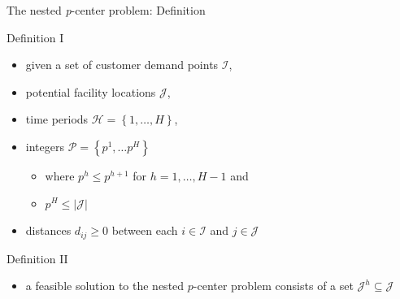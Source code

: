 \documentclass[utf8,aspectratio=169,ngerman,english]{beamer}
\begin{document}
\begin{frame}{The nested \textit{p}-center problem: Definition}
    \begin{minipage}{0.48\textwidth}
        \begin{block}{Definition I}
            \begin{itemize}
                \item given a set of customer demand points $\mathcal I$, \pause
                \item potential facility locations $\mathcal J$, \pause
                \item time periods $\mathcal H = \left \{1,\dots,H \right \}$, \pause
                \item integers $\mathcal P = \left \{p^1, \dots p^H \right \}$   \pause
                \begin{itemize} 
                    \item where $p^h \leq p^{h+1}$ for $h = 1, \dots, H-1$ and
                    \item $p^H \leq \left\lvert \mathcal J \right\rvert$
                \end{itemize} \pause
                \item distances $d_{ij} \geq 0$ between each $i \in \mathcal I$ and $j \in \mathcal J$ \pause
            \end{itemize}
        \end{block}
    \end{minipage}
    \begin{minipage}{0.48\textwidth}
        \begin{block}{Definition II}
            \vspace*{3pt}
            \begin{itemize}
                \item a feasible solution to the nested $p$-center problem consists of a set $\mathcal J^h \subseteq \mathcal J$ \pause

\end{itemize}
\end{block}
\end{minipage}
\end{frame}
\end{document}
